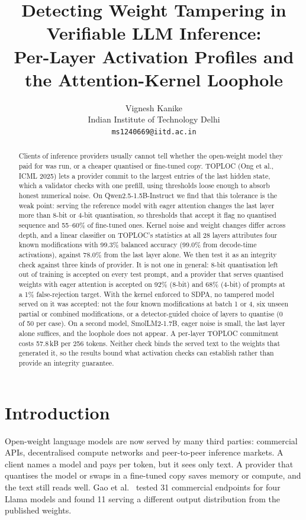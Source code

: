 \documentclass[11pt]{article}
\title{Detecting Weight Tampering in Verifiable LLM Inference:\\Per-Layer Activation Profiles and the Attention-Kernel Loophole}
\author{
  Vignesh Kanike\\
  Indian Institute of Technology Delhi\\
  \texttt{ms1240669@iitd.ac.in}
}
\date{}
\begin{document}
\maketitle

\begin{abstract}
Clients of inference providers usually cannot tell whether the open-weight model they paid for was run, or a cheaper quantised or fine-tuned copy.
TOPLOC (Ong et al., ICML 2025) lets a provider commit to the largest entries of the last hidden state, which a validator checks with one prefill, using thresholds loose enough to absorb honest numerical noise.
On Qwen2.5-1.5B-Instruct we find that this tolerance is the weak point: serving the reference model with eager attention changes the last layer more than 8-bit or 4-bit quantisation, so thresholds that accept it flag no quantised sequence and 55--60\% of fine-tuned ones.
Kernel noise and weight changes differ across depth, and a linear classifier on TOPLOC's statistics at all 28 layers attributes four known modifications with 99.3\% balanced accuracy (99.0\% from decode-time activations), against 78.0\% from the last layer alone.
We then test it as an integrity check against three kinds of provider.
It is not one in general: 8-bit quantisation left out of training is accepted on every test prompt, and a provider that serves quantised weights with eager attention is accepted on 92\% (8-bit) and 68\% (4-bit) of prompts at a 1\% false-rejection target.
With the kernel enforced to SDPA, no tampered model served on it was accepted: not the four known modifications at batch 1 or 4, six unseen partial or combined modifications, or a detector-guided choice of layers to quantise (0 of 50 per case).
On a second model, SmolLM2-1.7B, eager noise is small, the last layer alone suffices, and the loophole does not appear.
A per-layer TOPLOC commitment costs 57.8\,kB per 256 tokens.
Neither check binds the served text to the weights that generated it, so the results bound what activation checks can establish rather than provide an integrity guarantee.
\end{abstract}

\section{Introduction}
\label{sec:intro}

Open-weight language models are now served by many third parties: commercial APIs, decentralised compute networks and peer-to-peer inference markets.
A client names a model and pays per token, but it sees only text.
A provider that quantises the model or swaps in a fine-tuned copy saves memory or compute, and the text still reads well.
Gao et al.~\cite{gao2025model} tested 31 commercial endpoints for four Llama models and found 11 serving a different output distribution from the published weights.
\end{document}
